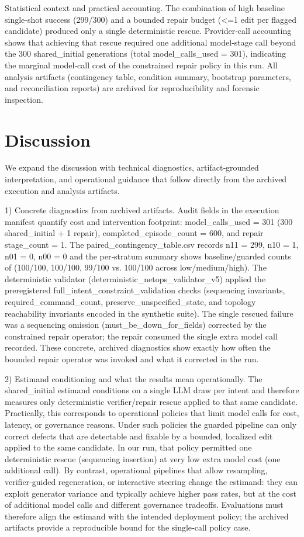 \documentclass[conference]{IEEEtran}
\begin{document}
Statistical context and practical accounting. The combination of high baseline single‑shot success (299/300) and a bounded repair budget (<=1 edit per flagged candidate) produced only a single deterministic rescue. Provider‑call accounting shows that achieving that rescue required one additional model‑stage call beyond the 300 shared\_initial generations (total model\_calls\_used = 301), indicating the marginal model‑call cost of the constrained repair policy in this run. All analysis artifacts (contingency table, condition summary, bootstrap parameters, and reconciliation reports) are archived for reproducibility and forensic inspection.

\section{Discussion}
We expand the discussion with technical diagnostics, artifact‑grounded interpretation, and operational guidance that follow directly from the archived execution and analysis artifacts.

1) Concrete diagnostics from archived artifacts. Audit fields in the execution manifest quantify cost and intervention footprint: model\_calls\_used = 301 (300 shared\_initial + 1 repair), completed\_episode\_count = 600, and repair stage\_count = 1. The paired\_contingency\_table.csv records n11 = 299, n10 = 1, n01 = 0, n00 = 0 and the per‑stratum summary shows baseline/guarded counts of (100/100, 100/100, 99/100 vs. 100/100 across low/medium/high). The deterministic validator (deterministic\_netops\_validator\_v5) applied the preregistered full\_intent\_constraint\_validation checks (sequencing invariants, required\_command\_count, preserve\_unspecified\_state, and topology reachability invariants encoded in the synthetic suite). The single rescued failure was a sequencing omission (must\_be\_down\_for\_fields) corrected by the constrained repair operator; the repair consumed the single extra model call recorded. These concrete, archived diagnostics show exactly how often the bounded repair operator was invoked and what it corrected in the run.

2) Estimand conditioning and what the results mean operationally. The shared\_initial estimand conditions on a single LLM draw per intent and therefore measures only deterministic verifier/repair rescue applied to that same candidate. Practically, this corresponds to operational policies that limit model calls for cost, latency, or governance reasons. Under such policies the guarded pipeline can only correct defects that are detectable and fixable by a bounded, localized edit applied to the same candidate. In our run, that policy permitted one deterministic rescue (sequencing insertion) at very low extra model cost (one additional call). By contrast, operational pipelines that allow resampling, verifier‑guided regeneration, or interactive steering change the estimand: they can exploit generator variance and typically achieve higher pass rates, but at the cost of additional model calls and different governance tradeoffs. Evaluations must therefore align the estimand with the intended deployment policy; the archived artifacts provide a reproducible bound for the single‑call policy case.
\end{document}
